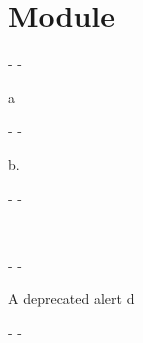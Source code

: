 \section{Module }\label{module-Alerts}%
\label{module-Alerts-val-a}\begin{ocamlindent}\begin{description}\kern-\topsep
\makeatletter\advance\@topsepadd-\topsep\makeatother%
\item[{deprecated}]{a}\end{description}%
\end{ocamlindent}%
\medbreak
\label{module-Alerts-val-b}\begin{ocamlindent}\begin{description}\kern-\topsep
\makeatletter\advance\@topsepadd-\topsep\makeatother%
\item[{deprecated}]{b.}\end{description}%
\end{ocamlindent}%
\medbreak
\label{module-Alerts-val-c}\begin{ocamlindent}\begin{description}\kern-\topsep
\makeatletter\advance\@topsepadd-\topsep\makeatother%
\item[{deprecated}]{}\end{description}%
\end{ocamlindent}%
\medbreak
\label{module-Alerts-module-Top1}\begin{ocamlindent}\end{ocamlindent}%
\\
\label{module-Alerts-val-d}\begin{ocamlindent}\begin{description}\kern-\topsep
\makeatletter\advance\@topsepadd-\topsep\makeatother%
\item[{deprecated}]{A deprecated alert d}\end{description}%
\end{ocamlindent}%
\medbreak
\label{module-Alerts-val-d2}\begin{ocamlindent}\begin{description}\kern-\topsep
\makeatletter\advance\@topsepadd-\topsep\makeatother%
\item[{deprecated}]{}\end{description}%
\end{ocamlindent}%
